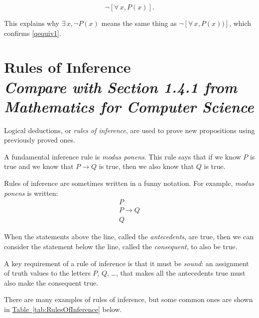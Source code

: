\documentclass[11pt,oneside]{book}
\theoremstyle{definition}
\begin{document}
\[ \lnot[\forall\, x, P(x)]. \]

This explains why $\exists\, x, \lnot P(x)$ means the same thing as $\lnot[\forall\, x, P(x))]$, which confirms \eqref{qequiv1}.


\section[Rules of Inference]{Rules of Inference\\[0.5ex]
\normalsize\normalfont\textit{
    Compare with Section 1.4.1 from \emph{Mathematics for Computer Science}
}}\label{sec:RulesOfInference}
Logical deductions, or \emph{rules of inference}, are used to prove new propositions using
previously proved ones.

A fundamental inference rule is \emph{modus ponens}.
This rule says that if we know $P$ is true and we know that $P \rightarrow Q$ is true, then we also know that $Q$ is true.

Rules of inference are sometimes written in a funny notation.
For example, \emph{modus ponens} is written:
\[\begin{array}{l}
    P \\
    P \rightarrow Q \\
    \hline
    Q
\end{array}\]

When the statements above the line, called the \emph{antecedents}, are true, then we can consider the statement below the line, called the \emph{consequent}, to also be true.

A key requirement of a rule of inference is that it must be \emph{sound}: an assignment
of truth values to the letters $P$, $Q$, \dots, that makes all the antecedents true must
also make the consequent true.

There are many examples of rules of inference, but some common ones are shown in \hyperref[tab:RulesOfInference]{Table~\ref*{tab:RulesOfInference}} below.
\end{document}
